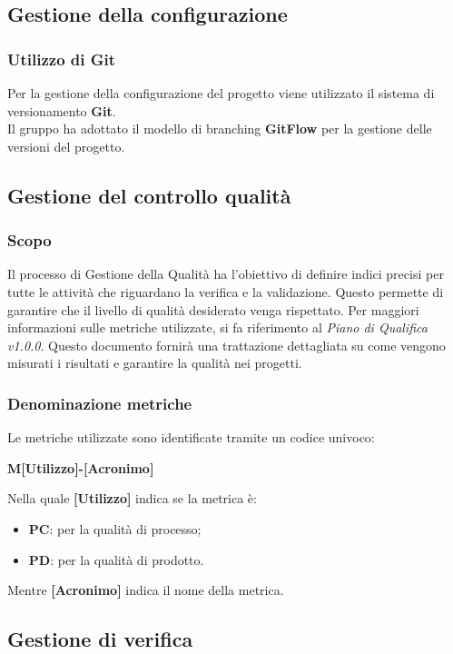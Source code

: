 \subsection{Gestione della configurazione}

\subsubsection{Utilizzo di Git}
Per la gestione della configurazione del progetto viene utilizzato il sistema di versionamento \textbf{Git}.\\
Il gruppo ha adottato il modello di branching \textbf{GitFlow} per la gestione delle versioni del progetto.\\


\subsection{Gestione del controllo qualità}
\subsubsection{Scopo}
Il processo di Gestione della Qualità ha l'obiettivo di definire indici
precisi per tutte le attività che riguardano la verifica e la validazione.
Questo permette di garantire che il livello di qualità desiderato venga
rispettato. Per maggiori informazioni sulle metriche utilizzate,
si fa riferimento al \textit{Piano di Qualifica v1.0.0}.
Questo documento fornirà una trattazione dettagliata su come
vengono misurati i risultati e garantire la qualità nei progetti.
\subsubsection{Denominazione metriche}
Le metriche utilizzate sono identificate tramite un codice univoco:
\begin{center}
    \textbf{M[Utilizzo]-[Acronimo]}
\end{center}
Nella quale \textbf{[Utilizzo]} indica se la metrica è:
\begin{itemize}
    \item \textbf{PC}: per la qualità di processo;
    \item \textbf{PD}:  per la qualità di prodotto.
\end{itemize}
Mentre \textbf{[Acronimo]} indica il nome della metrica.
\subsection{Gestione di verifica}

